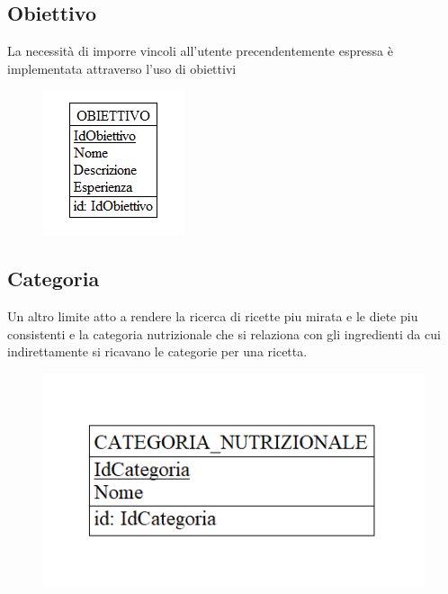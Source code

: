 ﻿\documentclass[a4paper,12pt]{report}
\begin{document}
\subsection{Obiettivo}
La necessità di imporre vincoli all'utente precendentemente espressa
è implementata attraverso l'uso di obiettivi
\begin{figure}[H]
    \centering
    \includegraphics[width=0.5\linewidth]{app_images/obiettivo-concettuale.png}
\end{figure}
\subsection{Categoria}
Un altro limite atto a rendere la ricerca di ricette
piu mirata e le diete piu consistenti e la categoria nutrizionale
che si relaziona con gli ingredienti da cui indirettamente si ricavano le categorie
per una ricetta.
\begin{figure}[H]
    \centering
    \includegraphics[width=0.8\linewidth]{app_images/categoria-nutrizionale.png}
\end{figure}
\end{document}
